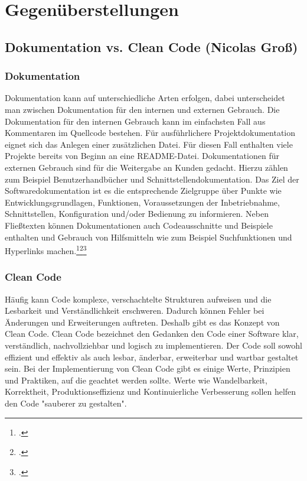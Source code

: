 \section{Gegenüberstellungen}

\subsection*{Dokumentation vs. Clean Code (Nicolas Groß)}

\subsubsection*{Dokumentation}
Dokumentation kann auf unterschiedliche Arten erfolgen, dabei unterscheidet man zwischen Dokumentation für den internen und externen Gebrauch. Die Dokumentation für den internen Gebrauch kann im einfachsten Fall aus Kommentaren im Quellcode bestehen. Für ausführlichere Projektdokumentation eignet sich das Anlegen einer zusätzlichen Datei. Für diesen Fall enthalten viele Projekte bereits von Beginn an eine README-Datei. Dokumentationen für externen Gebrauch sind für die Weitergabe an Kunden gedacht. Hierzu zählen zum Beispiel Benutzerhandbücher und Schnittstellendokumentation. Das Ziel der Softwaredokumentation ist es die entsprechende Zielgruppe über Punkte wie Entwicklungsgrundlagen, Funktionen, Voraussetzungen der Inbetriebnahme, Schnittstellen, Konfiguration und/oder Bedienung zu informieren. Neben Fließtexten können Dokumentationen auch Codeausschnitte und Beispiele enthalten und Gebrauch von Hilfsmitteln wie zum Beispiel Suchfunktionen und Hyperlinks machen.\footcite[.vgl]{DokuCode}\footcite[.vgl]{SoftwareDoku}\footcite[.vgl]{SoftwareDokub}

\subsubsection*{Clean Code}
Häufig kann Code komplexe, verschachtelte Strukturen aufweisen und die Lesbarkeit und Verständlichkeit erschweren. Dadurch können Fehler bei Änderungen und Erweiterungen auftreten. Deshalb gibt es das Konzept von Clean Code. Clean Code bezeichnet den Gedanken den Code einer Software klar, verständlich, nachvollziehbar und logisch zu implementieren. Der Code soll sowohl effizient und effektiv als auch lesbar, änderbar, erweiterbar und wartbar gestaltet sein. Bei der Implementierung von Clean Code gibt es einige Werte, Prinzipien und Praktiken, auf die geachtet werden sollte.
Werte wie Wandelbarkeit, Korrektheit, Produktionseffizienz und Kontinuierliche Verbesserung sollen helfen den Code "sauberer zu gestalten".

